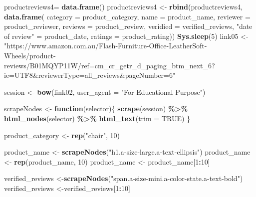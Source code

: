 \documentclass[
]{article}
\newenvironment{Shaded}{\begin{snugshade}}{\end{snugshade}}
\newcommand{\AttributeTok}[1]{\textcolor[rgb]{0.13,0.29,0.53}{#1}}
\newcommand{\ConstantTok}[1]{\textcolor[rgb]{0.56,0.35,0.01}{#1}}
\newcommand{\ControlFlowTok}[1]{\textcolor[rgb]{0.13,0.29,0.53}{\textbf{#1}}}
\newcommand{\DecValTok}[1]{\textcolor[rgb]{0.00,0.00,0.81}{#1}}
\newcommand{\FunctionTok}[1]{\textcolor[rgb]{0.13,0.29,0.53}{\textbf{#1}}}
\newcommand{\NormalTok}[1]{#1}
\newcommand{\OtherTok}[1]{\textcolor[rgb]{0.56,0.35,0.01}{#1}}
\newcommand{\SpecialCharTok}[1]{\textcolor[rgb]{0.81,0.36,0.00}{\textbf{#1}}}
\newcommand{\StringTok}[1]{\textcolor[rgb]{0.31,0.60,0.02}{#1}}
\begin{document}
\begin{Shaded}
\begin{Highlighting}[]
\NormalTok{  productreviews4}\OtherTok{=} \FunctionTok{data.frame}\NormalTok{()}
\NormalTok{  productreviews4 }\OtherTok{\textless{}{-}} \FunctionTok{rbind}\NormalTok{(productreviews4, }\FunctionTok{data.frame}\NormalTok{(}
                      \AttributeTok{category =}\NormalTok{ product\_category,}
                      \AttributeTok{name =}\NormalTok{ product\_name,}
                      \AttributeTok{reviewer =}\NormalTok{ product\_reviewer,}
                      \AttributeTok{reviews =}\NormalTok{ product\_review,}
                      \AttributeTok{veridied =}\NormalTok{ verified\_reviews,}
                      \StringTok{"date of review"} \OtherTok{=}\NormalTok{ product\_date,}
                      \AttributeTok{ratings =}\NormalTok{ product\_rating))}
  \FunctionTok{Sys.sleep}\NormalTok{(}\DecValTok{5}\NormalTok{)}
\NormalTok{link05 }\OtherTok{\textless{}{-}} \StringTok{"https://www.amazon.com.au/Flash{-}Furniture{-}Office{-}LeatherSoft{-}Wheels/product{-}reviews/B01MQYP11W/ref=cm\_cr\_getr\_d\_paging\_btm\_next\_6?ie=UTF8\&reviewerType=all\_reviews\&pageNumber=6"}


\NormalTok{  session }\OtherTok{\textless{}{-}} \FunctionTok{bow}\NormalTok{(link02,}
               \AttributeTok{user\_agent =} \StringTok{"For Educational Purpose"}\NormalTok{)}

\NormalTok{  scrapeNodes }\OtherTok{\textless{}{-}} \ControlFlowTok{function}\NormalTok{(selector)\{}
    \FunctionTok{scrape}\NormalTok{(session) }\SpecialCharTok{\%\textgreater{}\%}
      \FunctionTok{html\_nodes}\NormalTok{(selector) }\SpecialCharTok{\%\textgreater{}\%}
      \FunctionTok{html\_text}\NormalTok{(}\AttributeTok{trim =} \ConstantTok{TRUE}\NormalTok{)}
\NormalTok{  \}}

\NormalTok{  product\_category }\OtherTok{\textless{}{-}} \FunctionTok{rep}\NormalTok{(}\StringTok{"chair"}\NormalTok{, }\DecValTok{10}\NormalTok{)}

\NormalTok{  product\_name }\OtherTok{\textless{}{-}} \FunctionTok{scrapeNodes}\NormalTok{(}\StringTok{"h1.a{-}size{-}large.a{-}text{-}ellipsis"}\NormalTok{)}
\NormalTok{  product\_name }\OtherTok{\textless{}{-}} \FunctionTok{rep}\NormalTok{(product\_name, }\DecValTok{10}\NormalTok{)}
\NormalTok{  product\_name }\OtherTok{\textless{}{-}}\NormalTok{ product\_name[}\DecValTok{1}\SpecialCharTok{:}\DecValTok{10}\NormalTok{]}
  
\NormalTok{  verified\_reviews }\OtherTok{\textless{}{-}}\FunctionTok{scrapeNodes}\NormalTok{(}\StringTok{"span.a{-}size{-}mini.a{-}color{-}state.a{-}text{-}bold"}\NormalTok{)}
\NormalTok{  verified\_reviews }\OtherTok{\textless{}{-}}\NormalTok{verified\_reviews[}\DecValTok{1}\SpecialCharTok{:}\DecValTok{10}\NormalTok{]}
  

\end{Highlighting}
\end{Shaded}
\end{document}
